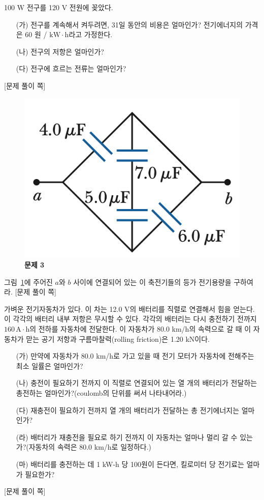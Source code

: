 \documentclass[tightenlines,floatfix,nofootinbib,superscriptaddress,fleqn]{revtex4}
\begin{document}
 100 W 전구를 120 V 전원에 꽂았다.
\begin{itemize}
\item[(가)] 전구를 계속해서 켜두려면, 31일 동안의 비용은 얼마인가?
  전기에너지의 가격은 60 원 / $\mathrm{kW\cdot h}$라고 가정한다.
\item[(나)] 전구의 저항은 얼마인가?
\item[(다)] 전구에 흐르는 전류는 얼마인가? 
\end{itemize}

\newpage
{\color{gray} [문제 풀이 쪽]}
\newpage

\begin{figure}[htp]
  \centering
  \includegraphics[scale=0.5]{qfig7-1.png}
  \caption{\textbf{문제 3}}
  \label{fig:3}
\end{figure}
그림~\ref{fig:3}에 주어진 $a$와 $b$ 사이에 연결되어 있는 이 축전기들의
등가 전기용량을 구하여라.  
\newpage
{\color{gray} [문제 풀이 쪽]}
\newpage

가벼운 전기자동차가 있다. 이 차는 12.0 V의 배터리를 직렬로 연결해서
힘을 얻는다. 이 각각의 배터리 내부 저항은 무시할 수 있다. 각각의
배터리는 다시 충전하기 전까지 $160\,\mathrm{A\cdot h}$의 전하를
자동차에 전달한다. 이 자동차가 80.0 km/h의 속력으로 갈 때 이 자동차가
맏는 공기 저항과 구름마찰력(rolling friction)은 1.20 kN이다. 
\begin{itemize}
\item[(가)] 만약에 자동차가 80.0 km/h로 가고 있을 때 전기 모터가
  자동차에 전해주는 최소 일률은 얼마인가?
\item[(나)] 충전이 필요하기 전까지 이 직렬로 연결되어 있는 열 개의
  배터리가 전달하는 총전하는 얼마인가?(coulomb의 단위를 써서
  나타내어라.) 
\item[(다)] 재충전이 필요하기 전까지 열 개의 배터리가 전달하는 총
  전기에너지는 얼마인가? 
\item[(라)] 배터리가 재충전을 필요로 하기 전까지 이 자동차는 얼마나
  멀리 갈 수 있는가?(자동차의 속력은 80.0 km/h로 일정하다.)
\item[(마)] 배터리를 충전하는 데 1 kW-h 당 100원이 든다면, 킬로미터 당
  전기료는 얼마가 필요한가? 
\end{itemize}

\newpage
{\color{gray} [문제 풀이 쪽]}
\newpage
\end{document}
